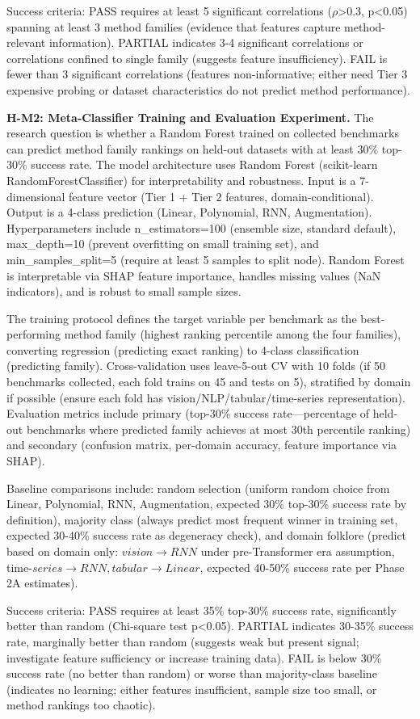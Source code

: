 Success criteria: PASS requires at least 5 significant correlations ($\rho$>0.3, p<0.05) spanning at least 3 method families (evidence that features capture method-relevant information). PARTIAL indicates 3-4 significant correlations or correlations confined to single family (suggests feature insufficiency). FAIL is fewer than 3 significant correlations (features non-informative; either need Tier 3 expensive probing or dataset characteristics do not predict method performance).

\textbf{H-M2: Meta-Classifier Training and Evaluation Experiment.} The research question is whether a Random Forest trained on collected benchmarks can predict method family rankings on held-out datasets with at least 30\% top-30\% success rate. The model architecture uses Random Forest (scikit-learn RandomForestClassifier) for interpretability and robustness. Input is a 7-dimensional feature vector (Tier 1 + Tier 2 features, domain-conditional). Output is a 4-class prediction (Linear, Polynomial, RNN, Augmentation). Hyperparameters include n\_estimators=100 (ensemble size, standard default), max\_depth=10 (prevent overfitting on small training set), and min\_samples\_split=5 (require at least 5 samples to split node). Random Forest is interpretable via SHAP feature importance, handles missing values (NaN indicators), and is robust to small sample sizes.

The training protocol defines the target variable per benchmark as the best-performing method family (highest ranking percentile among the four families), converting regression (predicting exact ranking) to 4-class classification (predicting family). Cross-validation uses leave-5-out CV with 10 folds (if 50 benchmarks collected, each fold trains on 45 and tests on 5), stratified by domain if possible (ensure each fold has vision/NLP/tabular/time-series representation). Evaluation metrics include primary (top-30\% success rate---percentage of held-out benchmarks where predicted family achieves at most 30th percentile ranking) and secondary (confusion matrix, per-domain accuracy, feature importance via SHAP).

Baseline comparisons include: random selection (uniform random choice from Linear, Polynomial, RNN, Augmentation, expected 30\% top-30\% success rate by definition), majority class (always predict most frequent winner in training set, expected 30-40\% success rate as degeneracy check), and domain folklore (predict based on domain only: $vision\rightarrow RNN$ under pre-Transformer era assumption, time-$series\rightarrow RNN, tabular\rightarrow Linear$, expected 40-50\% success rate per Phase 2A estimates).

Success criteria: PASS requires at least 35\% top-30\% success rate, significantly better than random (Chi-square test p<0.05). PARTIAL indicates 30-35\% success rate, marginally better than random (suggests weak but present signal; investigate feature sufficiency or increase training data). FAIL is below 30\% success rate (no better than random) or worse than majority-class baseline (indicates no learning; either features insufficient, sample size too small, or method rankings too chaotic).
